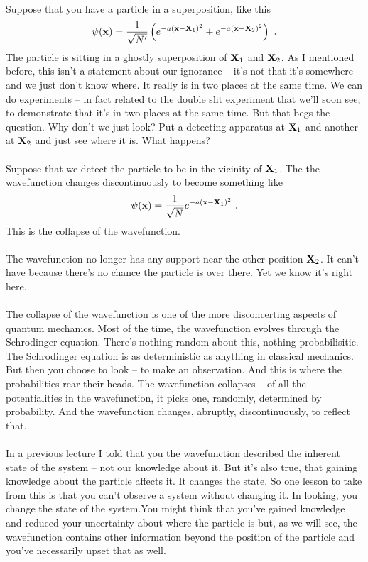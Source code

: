 \documentclass[12pt]{article}
\def\be{\begin{eqnarray}}
\def\ee{\end{eqnarray}}
\newcommand{\nn}{\nonumber}
\newcommand\para{\paragraph{}}
\newcommand{\bx}{{\bf x}}
\begin{document}
\para
{\color{olive} Suppose that you have a particle in a superposition, like this
%
\be \psi(\bx) = \frac{1}{\sqrt{N'}}\left(e^{-a(\bx - {\bf X}_1)^2} + e^{-a(\bx - {\bf X}_2)^2}\right)\ .\nn\ee}
%
The particle is sitting in a ghostly superposition of ${\bf X}_1$ and ${\bf X}_2$. As I mentioned before, this isn't a statement about our ignorance -- it's not that it's somewhere and we just don't know where. It really is in two places at the same time. We can do experiments -- in fact related to the double slit experiment that we'll soon see, to demonstrate that it's in two places at the same time. But that begs the question. Why don't we just look? Put a detecting apparatus at ${\bf X}_1$ and another at ${\bf X}_2$ and just see where it is. What happens?

\para
{\color{olive} Suppose that we detect the particle to be in the vicinity of ${\bf X}_1$. The the wavefunction changes discontinuously to become something like
%
\be \psi(\bx) = \frac{1}{\sqrt{N}} e^{-a(\bx - {\bf X}_1)^2}\ .\nn\ee
This is the collapse of the wavefunction.}

\para
The wavefunction no longer has any support near the other position ${\bf X}_2$. It can't have because there's no chance the particle is over there. Yet  we know it's right here. 

\para
The collapse of the wavefunction is one of the more disconcerting aspects of quantum mechanics. Most of the time, the wavefunction evolves through the Schrodinger equation. There's nothing random about this, nothing probabilisitic. The Schrodinger equation is as deterministic as anything in classical mechanics. But then you choose to look -- to make an observation. And this is where the probabilities rear their heads. The wavefunction collapses -- of all the potentialities in the wavefunction, it picks one, randomly, determined by probability. And the wavefunction changes, abruptly, discontinuously, to reflect that.

\para
In a previous lecture I told that you the wavefunction described the inherent state of the system -- not our knowledge about it. But it's also true, that gaining knowledge about the particle affects it. It changes the state. So one lesson to take from this is that you can't observe a system without changing it. In looking, you change the state of the system.You might think that you've gained knowledge and reduced your uncertainty about where the particle is but, as we will see, the wavefunction contains other information beyond the position of the particle and you've necessarily upset that as well.
\end{document}
